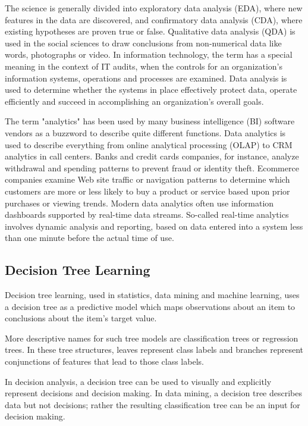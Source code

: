 \documentclass[12pt]{article}
\begin{document}
The science is generally divided into exploratory data analysis (EDA), where new features in the data are discovered, and confirmatory data analysis (CDA), where existing hypotheses are proven true or false. Qualitative data analysis (QDA) is used in the social sciences to draw conclusions from non-numerical data like words, photographs or video. In information technology, the term has a special meaning in the context of IT audits, when the controls for an organization's information systems, operations and processes are examined. Data analysis is used to determine whether the systems in place effectively protect data, operate efficiently and succeed in accomplishing an organization's overall goals.

The term "analytics" has been used by many business intelligence (BI) software vendors as a buzzword to describe quite different functions. Data analytics is used to describe everything from online analytical processing (OLAP) to CRM analytics in call centers. Banks and credit cards companies, for instance, analyze withdrawal and spending patterns to prevent fraud or identity theft. Ecommerce companies examine Web site traffic or navigation patterns to determine which customers are more or less likely to buy a product or service based upon prior purchases or viewing trends. Modern data analytics often use information dashboards supported by real-time data streams. So-called real-time analytics involves dynamic analysis and reporting, based on data entered into a system less than one minute before the actual time of use.

\subsection{Decision Tree Learning}
Decision tree learning, used in statistics, data mining and machine learning, uses a decision tree as a predictive model which maps observations about an item to conclusions about the item's target value. 

More descriptive names for such tree models are classification trees or regression trees. In these tree structures, leaves represent class labels and branches represent conjunctions of features that lead to those class labels.

In decision analysis, a decision tree can be used to visually and explicitly represent decisions and decision making. In data mining, a decision tree describes data but not decisions; rather the resulting classification tree can be an input for decision making.
\end{document}
